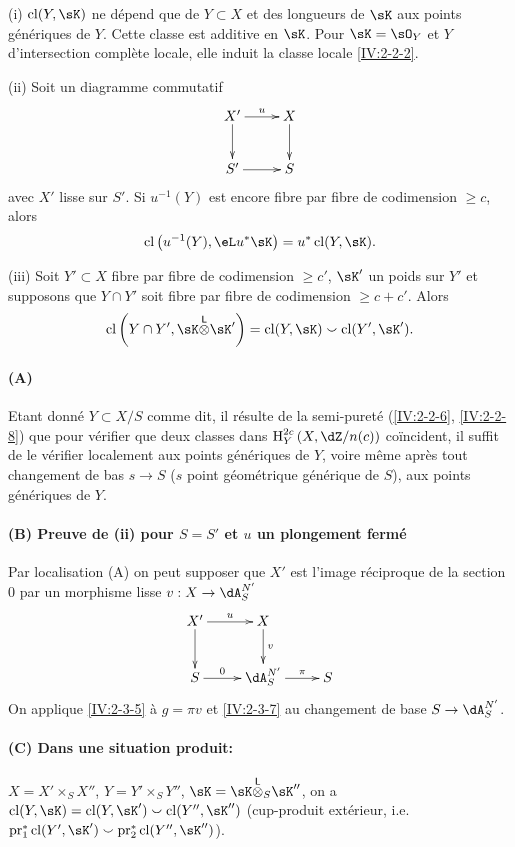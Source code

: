 \begin{theorem}\label{IV:2-3-8}
(i) $\cl(Y,\sK)$ ne dépend que de $Y\subset X$ et des longueurs de $\sK$ aux 
points génériques de $Y$. Cette classe est additive en $\sK$. Pour 
$\sK=\sO_Y$ et $Y$ d'intersection complète locale, elle induit la classe 
locale \ref{IV:2-2-2}.

(ii) Soit un diagramme commutatif 
\[\xymatrix{
  X' \ar[r]^-u \ar[d] 
    & X \ar[d] \\
  S' \ar[r] 
    & S
}\]
avec $X'$ lisse sur $S'$. Si $u^{-1}(Y)$ est encore fibre par fibre de 
codimension $\geqslant c$, alors 
\[
  \cl\left(u^{-1}(Y),\eL u^\ast\sK\right) = u^\ast \cl(Y,\sK) \text{.}
\]

(iii) Soit $Y'\subset X$ fibre par fibre de codimension $\geqslant c'$, 
$\sK'$ un poids sur $Y'$ et supposons que $Y\cap Y'$ soit fibre par fibre de 
codimension $\geqslant c+c'$. Alors 
\[
\cl\left(Y\cap Y',\sK\lotimes \sK'\right) = \cl(Y,\sK) \smallsmile \cl(Y',\sK') \text{.}
\]
\end{theorem}



\paragraph{(A)}
Etant donné $Y\subset X/S$ comme dit, il résulte de la semi-pureté 
(\ref{IV:2-2-6}, \ref{IV:2-2-8}) que pour vérifier que deux classes dans 
$\h_Y^{2 c}\left(X,\dZ/n(c)\right)$ coïncident, il suffit de le vérifier 
localement aux points génériques de $Y$, voire même après tout 
changement de bas $s\to S$ ($s$ point géométrique générique de $S$), 
aux points génériques de $Y$. 

\paragraph{(B) Preuve de (ii) pour $S=S'$ et $u$ un plongement fermé}
Par localisation (A) on peut supposer que $X'$ est l'image 
réciproque de la section $0$ par un morphisme lisse $v:X\to \dA_S^{N'}$ 
\[\xymatrix{
  X' \ar[r]^-u \ar[d] 
    & X \ar[d]^-v \\
  S \ar[r]^-0 
    & \dA_S^{N'} \ar[r]^-\pi 
    & S
}\]
On applique \ref{IV:2-3-5} à $g=\pi v$ et \ref{IV:2-3-7} au changement de 
base $S\to \dA_S^{N'}$. 

\paragraph{(C) Dans une situation produit:}
$X=X'\times_S X''$, $Y=Y'\times_S Y''$, $\sK=\sK\lotimes_S \sK''$, on a 
$\cl(Y,\sK) = \cl(Y,\sK')\smallsmile \cl(Y'',\sK'')$ (cup-produit extérieur, 
i.e. $\operatorname{pr}_1^\ast \cl(Y',\sK')\smallsmile \operatorname{pr}_2^\ast \cl(Y'',\sK'')$). 

